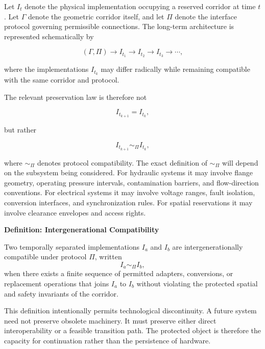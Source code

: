 \documentclass[11pt,fleqn]{book}
\numberwithin{equation}{chapter}
\newenvironment{definition}[1]
  {\begin{definitionEnv}
   \noindent\textbf{Definition: #1}\par\smallskip}
  {\end{definitionEnv}}
\theoremstyle{plain}
\theoremstyle{definition}
\theoremstyle{remark}
\begin{document}
Let \(I_t\) denote the physical implementation occupying a reserved corridor at time \(t\). Let \(\Gamma\) denote the geometric corridor itself, and let \(\Pi\) denote the interface protocol governing permissible connections. The long-term architecture is represented schematically by

\begin{equation}
    (\Gamma,\Pi)
    \longrightarrow
    I_{t_1}
    \longrightarrow
    I_{t_2}
    \longrightarrow
    I_{t_3}
    \longrightarrow \cdots,
\end{equation}

where the implementations \(I_{t_k}\) may differ radically while remaining compatible with the same corridor and protocol.

The relevant preservation law is therefore not

\begin{equation}
    I_{t_{k+1}} = I_{t_k},
\end{equation}

but rather

\begin{equation}
    I_{t_{k+1}} \sim_{\Pi} I_{t_k},
\end{equation}

where \(\sim_{\Pi}\) denotes protocol compatibility. The exact definition of \(\sim_{\Pi}\) will depend on the subsystem being considered. For hydraulic systems it may involve flange geometry, operating pressure intervals, contamination barriers, and flow-direction conventions. For electrical systems it may involve voltage ranges, fault isolation, conversion interfaces, and synchronization rules. For spatial reservations it may involve clearance envelopes and access rights.

\begin{definition}{Intergenerational Compatibility}
Two temporally separated implementations \(I_a\) and \(I_b\) are intergenerationally compatible under protocol \(\Pi\), written
\[
I_a \sim_{\Pi} I_b,
\]
when there exists a finite sequence of permitted adapters, conversions, or replacement operations that joins \(I_a\) to \(I_b\) without violating the protected spatial and safety invariants of the corridor.
\end{definition}

This definition intentionally permits technological discontinuity. A future system need not preserve obsolete machinery. It must preserve either direct interoperability or a feasible transition path. The protected object is therefore the capacity for continuation rather than the persistence of hardware.
\end{document}
